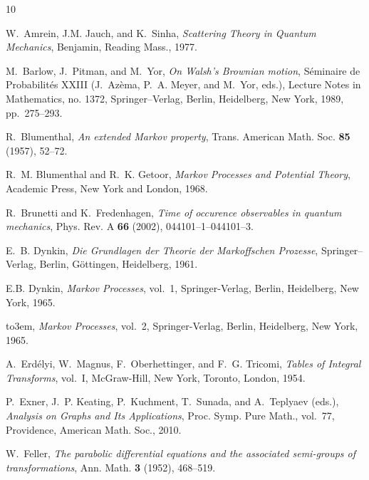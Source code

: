 \documentclass[11pt,a4paper]{amsart}
\newcommand{\1}{1}
\theoremstyle{remark}
\numberwithin{equation}{section}
\begin{document}
\providecommand{\bysame}{\leavevmode\hbox to3em{\hrulefill}\thinspace}
\providecommand{\MR}{\relax\ifhmode\unskip\space\fi MR }
\providecommand{\MRhref}[2]{%
  \href{http://www.ams.org/mathscinet-getitem?mr=#1}{#2}
}
\providecommand{\href}[2]{#2}
\begin{thebibliography}{10}

W.~Amrein, J.M. Jauch, and K.~Sinha, \emph{{S}cattering {T}heory in {Q}uantum
  {M}echanics}, Benjamin, Reading Mass., 1977.

M.~Barlow, J.~Pitman, and M.~Yor, \emph{{O}n {W}alsh's {B}rownian motion},
  S{\'e}minaire de Probabilit{\'e}s XXIII (J.~Az{\`e}ma, P.~A. Meyer, and
  M.~Yor, eds.), Lecture Notes in Mathematics, no. 1372, Springer--Verlag,
  Berlin, Heidelberg, New York, 1989, pp.~275--293.

R.~Blumenthal, \emph{{A}n extended {M}arkov property}, Trans. American Math.
  Soc. \textbf{85} (1957), 52--72.

R.~M. Blumenthal and R.~K. Getoor, \emph{{M}arkov {P}rocesses and {P}otential
  {T}heory}, Academic Press, New York and London, 1968.

R.~Brunetti and K.~Fredenhagen, \emph{{T}ime of occurence observables in
  quantum mechanics}, Phys. Rev. A \textbf{66} (2002), 044101--1--044101--3.

E.~B. Dynkin, \emph{{D}ie {G}rundlagen der {T}heorie der {M}arkoffschen
  {P}rozesse}, Springer--Verlag, Berlin, G\"ottingen, Heidelberg, 1961.

{E.B.} Dynkin, \emph{{M}arkov {P}rocesses}, vol.~1, Springer-Verlag, Berlin,
  Heidelberg, New York, 1965.

\bysame, \emph{{M}arkov {P}rocesses}, vol.~2, Springer-Verlag, Berlin,
  Heidelberg, New York, 1965.

A.~Erd{\'e}lyi, W.~Magnus, F.~Oberhettinger, and F.~G. Tricomi, \emph{{T}ables
  of {I}ntegral {T}ransforms}, vol.~I, McGraw-Hill, New York, Toronto, London,
  1954.

P.~Exner, J.~P. Keating, P.~Kuchment, T.~Sunada, and A.~Teplyaev (eds.),
  \emph{{A}nalysis on {G}raphs and {I}ts {A}pplications}, Proc. Symp. Pure
  Math., vol.~77, Providence, American Math. Soc., 2010.

W.~Feller, \emph{{T}he parabolic differential equations and the associated
  semi-groups of transformations}, Ann. Math. \textbf{3} (1952), 468--519.


\end{thebibliography}
\end{document}
